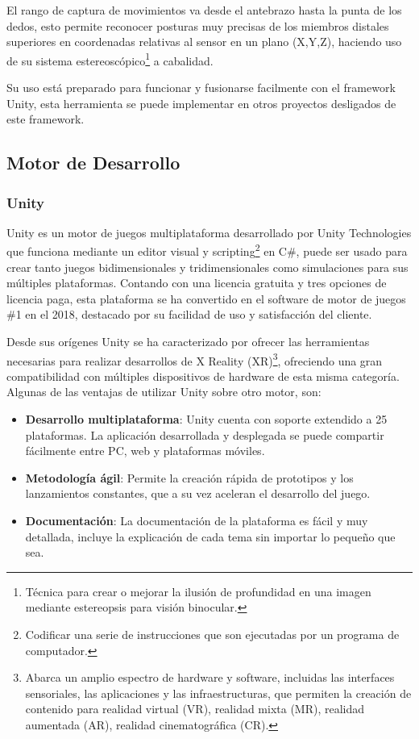 El rango de captura de movimientos va desde el antebrazo hasta la punta de los dedos, esto permite reconocer posturas muy precisas de los miembros distales superiores en coordenadas relativas al sensor en un plano (X,Y,Z), haciendo uso de su sistema estereoscópico\footnote{Técnica para crear o mejorar la ilusión de profundidad en una imagen mediante estereopsis para visión binocular.} a cabalidad.

Su uso está preparado para funcionar y fusionarse facilmente con el framework Unity, esta herramienta se puede implementar en otros proyectos desligados de este framework. \parencite{LeapMotionInc.2018LeapDeveloper}
\subsection{Motor de Desarrollo}
\subsubsection{Unity}
Unity es un motor de juegos multiplataforma desarrollado por Unity Technologies que funciona mediante un editor visual y scripting\footnote{Codificar una serie de instrucciones que son ejecutadas por un programa de computador.} en C\#, puede ser usado para crear tanto juegos bidimensionales y tridimensionales como simulaciones para sus múltiples plataformas. Contando con una licencia gratuita y tres opciones de licencia paga, esta plataforma se ha convertido en el software de motor de juegos \#1 en el 2018, destacado por su facilidad de uso y satisfacción del cliente. \parencite{G2Crowd2018Best2018}

Desde sus orígenes Unity se ha caracterizado por ofrecer las herramientas necesarias para realizar desarrollos de X Reality (XR)\footnote{Abarca un amplio espectro de hardware y software, incluidas las interfaces sensoriales, las aplicaciones y las infraestructuras, que permiten la creación de contenido para realidad virtual (VR), realidad mixta (MR), realidad aumentada (AR), realidad cinematográfica (CR).}, ofreciendo una gran compatibilidad con múltiples dispositivos de hardware de esta misma categoría. Algunas de las ventajas de utilizar Unity sobre otro motor, son:
\begin{itemize}
    \item \textbf{Desarrollo multiplataforma}: Unity cuenta con soporte extendido a 25 plataformas. \parencite{UnityTechnologies2018UnityPlatforms} La aplicación desarrollada y desplegada se puede compartir fácilmente entre PC, web y plataformas móviles. 
    \item \textbf{Metodología ágil}: Permite la creación rápida de prototipos y los lanzamientos constantes, que a su vez aceleran el desarrollo del juego.
    \item \textbf{Documentación}: La documentación de la plataforma es fácil y muy detallada, incluye la explicación de cada tema sin importar lo pequeño que sea.
    
\end{itemize}
    
